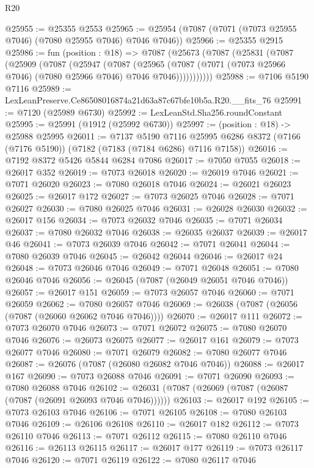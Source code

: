 \begin{lexlean}{R20}
\begin{coremodule}
{@25955 := @25355 @2553
@25965 := @25954 (@7087 (@7071 (@7073 @25955 @7046) (@7080 @25955 @7046) @7046 @7046))
@25966 := @25355 @2915
@25986 := fun (position : @18) =>
  @7087
    (@25673
      (@7087
        (@25831
          (@7087
            (@25909
              (@7087
                (@25947
                  (@7087
                    (@25965
                      (@7087 (@7071 (@7073 @25966 @7046) (@7080 @25966 @7046) @7046 @7046)))))))))))
@25988 := @7106 @5190 @7116
@25989 := LexLeanPreserve.Ce86508016874a21d63a87c67bfe10b5a.R20.__fits_76
@25991 := @7120 (@25989 @6730)
@25992 := LexLeanStd.Sha256.roundConstant
@25995 := @25991 (@1912 (@25992 @6730))
@25997 := (position : @18) -> @25988 @25995
@26011 := @7137
    @5190
    @7116
    @25995
    @6286
    @8372
    (@7166 (@7176 @5190))
    (@7182 (@7183 (@7184 @6286) @7116 @7158))
@26016 := @7192 @8372 @5426 @5844 @6284 @7086
@26017 := @7050 @7055
@26018 := @26017 @352
@26019 := @7073 @26018
@26020 := @26019 @7046
@26021 := @7071 @26020
@26023 := @7080 @26018 @7046
@26024 := @26021 @26023
@26025 := @26017 @172
@26027 := @7073 @26025 @7046
@26028 := @7071 @26027
@26030 := @7080 @26025 @7046
@26031 := @26028 @26030
@26032 := @26017 @156
@26034 := @7073 @26032 @7046
@26035 := @7071 @26034
@26037 := @7080 @26032 @7046
@26038 := @26035 @26037
@26039 := @26017 @46
@26041 := @7073 @26039 @7046
@26042 := @7071 @26041
@26044 := @7080 @26039 @7046
@26045 := @26042 @26044
@26046 := @26017 @24
@26048 := @7073 @26046 @7046
@26049 := @7071 @26048
@26051 := @7080 @26046 @7046
@26056 := @26045 (@7087 (@26049 @26051 @7046 @7046))
@26057 := @26017 @151
@26059 := @7073 @26057 @7046
@26060 := @7071 @26059
@26062 := @7080 @26057 @7046
@26069 := @26038 (@7087 (@26056 (@7087 (@26060 @26062 @7046 @7046))))
@26070 := @26017 @111
@26072 := @7073 @26070 @7046
@26073 := @7071 @26072
@26075 := @7080 @26070 @7046
@26076 := @26073 @26075
@26077 := @26017 @161
@26079 := @7073 @26077 @7046
@26080 := @7071 @26079
@26082 := @7080 @26077 @7046
@26087 := @26076 (@7087 (@26080 @26082 @7046 @7046))
@26088 := @26017 @167
@26090 := @7073 @26088 @7046
@26091 := @7071 @26090
@26093 := @7080 @26088 @7046
@26102 := @26031 (@7087 (@26069 (@7087 (@26087 (@7087 (@26091 @26093 @7046 @7046))))))
@26103 := @26017 @192
@26105 := @7073 @26103 @7046
@26106 := @7071 @26105
@26108 := @7080 @26103 @7046
@26109 := @26106 @26108
@26110 := @26017 @182
@26112 := @7073 @26110 @7046
@26113 := @7071 @26112
@26115 := @7080 @26110 @7046
@26116 := @26113 @26115
@26117 := @26017 @177
@26119 := @7073 @26117 @7046
@26120 := @7071 @26119
@26122 := @7080 @26117 @7046
}
\end{coremodule}
\end{lexlean}
